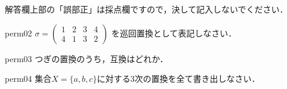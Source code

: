 \documentclass[a4paper]{ltjsarticle}
\begin{document}
{解答欄上部の「誤部正」は採点欄ですので，決して記入しないでください．

\vspace{1ex}
\hrulefill
\vspace{1ex}

\begin{question}{perm02}
\(\sigma = \begin{pmatrix}
	    1 & 2 & 3 & 4\\
	    4 & 1 & 3 & 2
	   \end{pmatrix}\)
を巡回置換として表記しなさい．
\end{question}
\begin{questionmult}{perm03}
つぎの置換のうち，互換はどれか．

\begin{choiceshoriz}
\end{choiceshoriz}
\end{questionmult}
\begin{question}{perm04}
集合\(X = \{a, b, c\}\)に対する3次の置換を全て書き出しなさい．
\end{question}
} %
\end{document}
